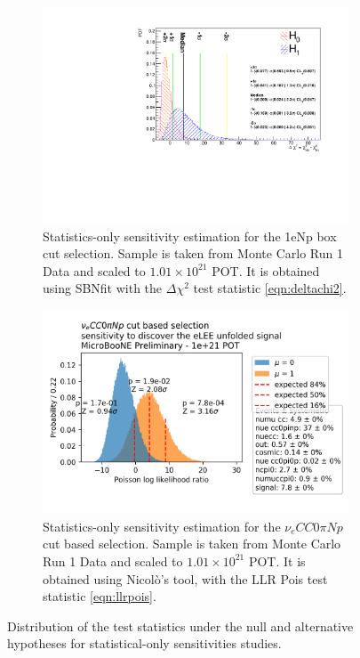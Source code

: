 \documentclass[a4paper]{article}
\newcommand{\nueccnopinp}{$\nu_e CC 0\pi Np$ }
\begin{document}
\begin{figure}[ht] 
\begin{center}
    \begin{subfigure}[b]{0.48\textwidth}
        \centering
        \includegraphics[width=1.\textwidth]{Sensitivity/SBNfit_Cls_nue_reco_e_genietune_run1_LEE_deltachi_statonly.pdf}
        \caption{Statistics-only sensitivity estimation for the 1eNp box cut selection. Sample is taken from Monte Carlo Run 1 Data and scaled to $1.01\times10^{21}$ POT. It is obtained using SBNfit with the $\Delta \chi^2$ test statistic \ref{eqn:deltachi2}.}
    \end{subfigure}
        \begin{subfigure}[b]{0.48\textwidth}
        \centering
        \includegraphics[width=1.\textwidth]{Sensitivity/pois_llr_discovery_totalpot_1e+21_nosyst.png}
        \caption{Statistics-only sensitivity estimation for the \nueccnopinp cut based selection. Sample is taken from Monte Carlo Run 1 Data and scaled to $1.01\times10^{21}$ POT. It is obtained using Nicol\`o's tool, with the LLR Pois test statistic \ref{eqn:llrpois}.}
    \end{subfigure}
\caption{Distribution of the test statistics under the null and alternative hypotheses for statistical-only sensitivities studies.}
\label{fig:1eNp:box:statonlysensitivity}
\end{center}
\end{figure}
\end{document}
